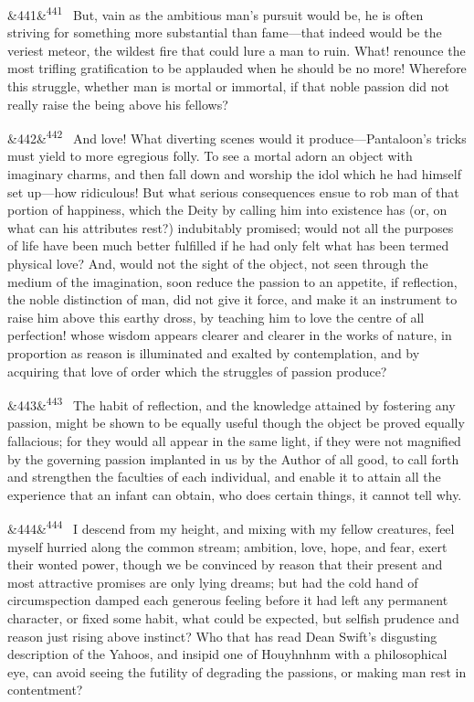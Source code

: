 \documentclass[12pt]{article}
\newcommand{\para}[1][]{\par\noindent\ifx&#1&\else\textsuperscript{\footnotesize #1}~\fi}
\begin{document}
\para[441] But, vain as the ambitious man's pursuit would be, he is often striving for something more substantial than fame---that indeed would be the veriest meteor, the wildest fire that could lure a man to ruin. What! renounce the most trifling gratification to be applauded when he should be no more! Wherefore this struggle, whether man is mortal or immortal, if that noble passion did not really raise the being above his fellows?

\para[442] And love! What diverting scenes would it produce---Pantaloon's tricks must yield to more egregious folly. To see a mortal adorn an object with imaginary charms, and then fall down and worship the idol which he had himself set up---how ridiculous! But what serious consequences ensue to rob man of that portion of happiness, which the Deity by calling him into existence has (or, on what can his attributes rest?) indubitably promised; would not all the purposes of life have been much better fulfilled if he had only felt what has been termed physical love? And, would not the sight of the object, not seen through the medium of the imagination, soon reduce the passion to an appetite, if reflection, the noble distinction of man, did not give it force, and make it an instrument to raise him above this earthy dross, by teaching him to love the centre of all perfection! whose wisdom appears clearer and clearer in the works of nature, in proportion as reason is illuminated and exalted by contemplation, and by acquiring that love of order which the struggles of passion produce?

\para[443] The habit of reflection, and the knowledge attained by fostering any passion, might be shown to be equally useful though the object be proved equally fallacious; for they would all appear in the same light, if they were not magnified by the governing passion implanted in us by the Author of all good, to call forth and strengthen the faculties of each individual, and enable it to attain all the experience that an infant can obtain, who does certain things, it cannot tell why.

\para[444] I descend from my height, and mixing with my fellow creatures, feel myself hurried along the common stream; ambition, love, hope, and fear, exert their wonted power, though we be convinced by reason that their present and most attractive promises are only lying dreams; but had the cold hand of circumspection damped each generous feeling before it had left any permanent character, or fixed some habit, what could be expected, but selfish prudence and reason just rising above instinct? Who that has read Dean Swift's disgusting description of the Yahoos, and insipid one of Houyhnhnm with a philosophical eye, can avoid seeing the futility of degrading the passions, or making man rest in contentment?
\end{document}
